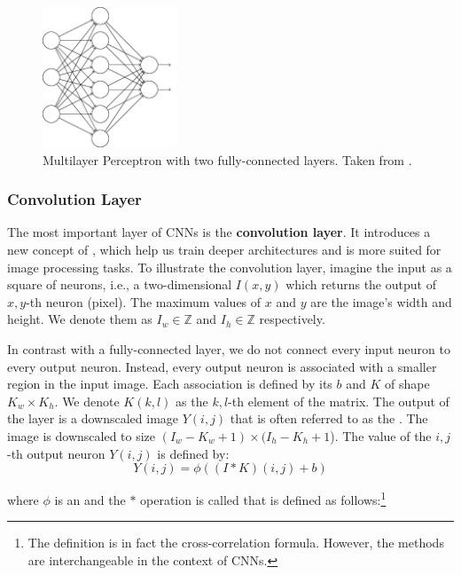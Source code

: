 \begin{figure}[h]
    \centering
    \includegraphics[width=4cm]{Sources/Figures/fully_connected_layer.png}
    \caption{Multilayer Perceptron with two fully-connected layers. Taken from
        \cite{nielsenneural}.}
    \label{fig:fcl}
\end{figure}

\subsubsection{Convolution Layer}

The most important layer of CNNs is the \textbf{convolution layer}. It
introduces a new concept of , which help us train deeper
architectures and is more suited for image processing tasks. To illustrate the
convolution layer, imagine the input as a square of neurons, i.e., a
two-dimensional  $I(x,y)$ which returns the output of $x,y$-th neuron
(pixel). The maximum values of $x$ and $y$ are the image's width and height.
We denote them as $I_w \in \mathds{Z}$ and $I_h \in \mathds{Z}$ respectively.


In contrast with a fully-connected layer, we do not connect every input neuron
to every output neuron. Instead, every output neuron is associated with a
smaller region in the input image. Each association is defined by its
 $b$ and  $K$ of shape $K_w \times K_h$.
We denote $K(k, l)$ as the $k,l$-th element of the matrix. The output of the layer
is a downscaled image $Y(i,j)$ that is often referred to as the .
The image is downscaled to size $(I_w - K_w + 1) \times (I_h - K_h + 1$).
    The value of the $i, j$-th output neuron $Y(i,j)$ is defined by:
$$
    Y(i, j) = \phi\left((I * K)(i,j) + b\right)
$$

where $\phi$ is an  and the $*$ operation is called 
that is defined as follows:\footnote{The definition is in fact the cross-correlation formula.
    However, the methods are interchangeable in the context of CNNs.}

